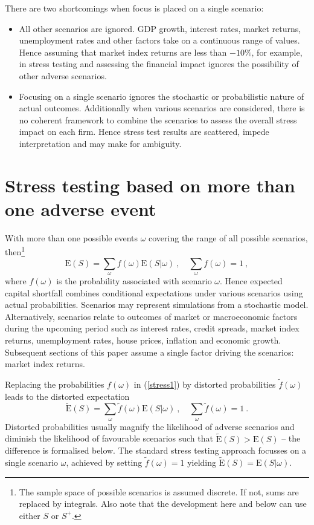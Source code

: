 \documentclass[authoryear]{elsarticle}
\newcommand{\E}{{\mathrm E}}
\newcommand{\cq}{\ ,\quad }
\newcommand{\eref}[1]{(\ref{#1})}
\newcommand{\bi}{\begin{itemize}}
\renewcommand{\i}{\item}
\newcommand{\ei}{\end{itemize}}
\begin{document}
There are two shortcomings when focus is placed on a single scenario:
\bi
\i All other scenarios are ignored. GDP growth, interest rates, market  returns, unemployment rates and other factors take on a continuous range of values. Hence assuming that market index returns are less than $-10\%$, for example, in stress testing and assessing the financial impact ignores the possibility of other adverse scenarios.

\i Focusing on a single scenario ignores the stochastic or probabilistic nature of actual outcomes. Additionally  when various scenarios are considered, there is no coherent framework to combine the scenarios to assess the overall stress impact on each firm. Hence stress test results are scattered, impede interpretation and may make for ambiguity.
\ei

\section{Stress testing based on more than one adverse event}\label{s_extend}

With more than one possible events $\omega$ covering the range of all possible scenarios, then\footnote{The sample space of possible scenarios is assumed discrete.   If not,  sums are replaced by integrals.  Also note that the development here and below can use either $S$ or $S^+$.}
\begin{equation}\label{stress1}
\E(S) =  \sum_\omega f(\omega) \E(S|\omega)\cq \sum_\omega f(\omega)=1\ ,
\end{equation}
where $f(\omega)$ is the probability associated with scenario $\omega$.
Hence expected capital shortfall combines conditional expectations under various scenarios using actual probabilities. Scenarios may represent simulations from a stochastic model.   Alternatively, scenarios relate to outcomes of market or macroeconomic factors during the upcoming period such as interest rates, credit spreads, market index returns, unemployment rates, house prices, inflation and economic growth. Subsequent sections of this paper assume a single factor driving the scenarios: market index returns.

Replacing the probabilities $f(\omega)$  in \eref{stress1} by distorted probabilities $\tilde f(\omega)$ leads to the distorted expectation
\begin{equation}\label{stress2}
\widetilde \E(S) =  \sum_\omega \tilde f(\omega) \E(S|\omega)\cq \sum_\omega \tilde f(\omega)=1\ .
\end{equation}
 Distorted  probabilities usually magnify the likelihood of adverse scenarios and diminish the likelihood of favourable scenarios such that  $\widetilde \E(S)>\E(S)$ -- the difference is formalised below. The standard stress testing approach focusses on a single scenario $\omega$, achieved by setting $\tilde f(\omega) =1$ yielding $\widetilde\E(S)=\E(S|\omega)$.
\end{document}
